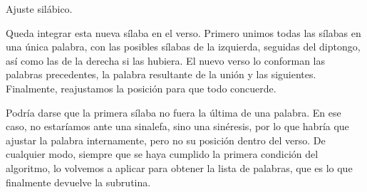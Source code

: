 \begin{algorithm}[!ht]
	\caption{Ajuste silábico.}\label{list:VerseMetre10}
\end{algorithm}

Queda integrar esta nueva sílaba en el verso. Primero unimos todas las sílabas en una única palabra, con las posibles sílabas de la izquierda, seguidas del diptongo, así como las de la derecha si las hubiera. El nuevo verso lo conforman las palabras precedentes, la palabra resultante de la unión y las siguientes. Finalmente, reajustamos la posición para que todo concuerde.

Podría darse que la primera sílaba no fuera la última de una palabra. En ese caso, no estaríamos ante una sinalefa, sino una sinéresis, por lo que habría que ajustar la palabra internamente, pero no su posición dentro del verso. De cualquier modo, siempre que se haya cumplido la primera condición del algoritmo, lo volvemos a aplicar para obtener la lista de palabras, que es lo que finalmente devuelve la subrutina.

